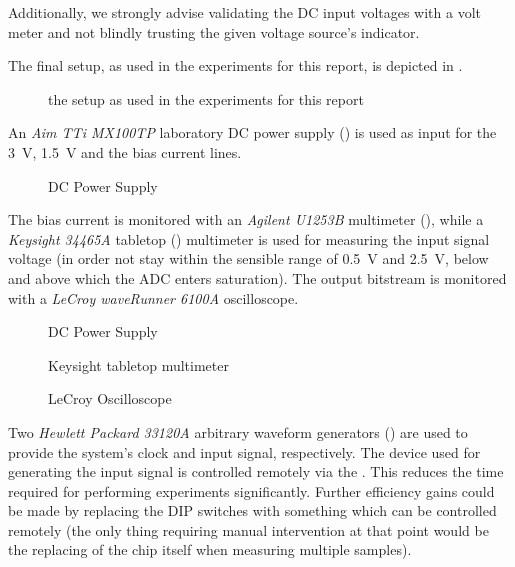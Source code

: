 Additionally, we strongly advise validating the  DC input voltages with a volt
meter and not blindly trusting the given voltage source's indicator.

The final setup, as used in the experiments for this report, is depicted in .

\begin{figure}
    \caption{the setup as used in the experiments for this report}
    \label{fig:completeSetup}
\end{figure}

An \emph{Aim TTi MX100TP} laboratory  DC power supply () is
used  as input  for the  \SI{3}{\volt}, \SI{1.5}{\volt}  and the  bias current
lines.

\begin{figure}
    \caption{DC Power Supply}
    \label{fig:dcSupply}
\end{figure}

The  bias  current  is  monitored with  an  \emph{Agilent  U1253B}  multimeter
(),  while   a  \emph{Keysight   34465A}  tabletop
()  multimeter is  used for  measuring the  input
signal voltage (in order not stay within the sensible range of \SI{0.5}{\volt}
and \SI{2.5}{\volt},  below and  above which  the ADC  enters saturation). The
output  bitstream   is  monitored   with  a  \emph{LeCroy   waveRunner  6100A}
oscilloscope.

\begin{figure}
    \caption{DC Power Supply}
    \label{fig:agilentMultimeter}
\end{figure}

\begin{figure}
    \caption{Keysight tabletop multimeter}
    \label{fig:keysightMultimeter}
\end{figure}

\begin{figure}
    \caption{LeCroy Oscilloscope}
    \label{fig:lecroyOscilloscope}
\end{figure}

Two    \emph{Hewlett   Packard    33120A}   arbitrary    waveform   generators
() are used  to provide the system's clock  and input signal,
respectively. The device  used for generating  the input signal  is controlled
remotely  via the  \raspi{}. This
reduces the  time required  for performing  experiments significantly. Further
efficiency gains  could be made by  replacing the DIP switches  with something
which can be controlled remotely (the only thing requiring manual intervention
at  that point  would  be the  replacing  of the  chip  itself when  measuring
multiple samples).

